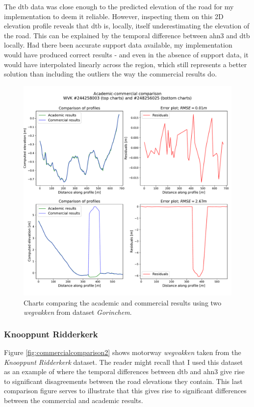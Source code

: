The \ac{dtb} data was close enough to the predicted elevation of the road for my implementation to deem it reliable. However, inspecting them on this 2D elevation profile reveals that \ac{dtb} is, locally, itself underestimating the elevation of the road. This can be explained by the temporal difference between \ac{ahn3} and \ac{dtb} locally. Had there been accurate support data available, my implementation would have produced correct results - and even in the absence of support data, it would have interpolated linearly across the region, which still represents a better solution than including the outliers the way the commercial results do.

\begin{figure}
    \centering
    \includegraphics[width=0.87\linewidth]{final_report/figs/commercialcomparison1.pdf}
    \caption[Charts comparing the academic and commercial results (\textit{Gorinchem})]{Charts comparing the academic and commercial results using two \textit{wegvakken} from dataset \textit{Gorinchem}.}
    \label{fig:commercialcomparison1}
\end{figure}

\subsubsection{Knooppunt Ridderkerk}

Figure \ref{fig:commercialcomparison2} shows motorway \textit{wegvakken} taken from the \textit{Knooppunt Ridderkerk} dataset. The reader might recall that I used this dataset as an example of where the temporal differences between \ac{dtb} and \ac{ahn3} give rise to significant disagreements between the road elevations they contain. This last comparison figure serves to illustrate that this gives rise to significant differences between the commercial and academic results.

